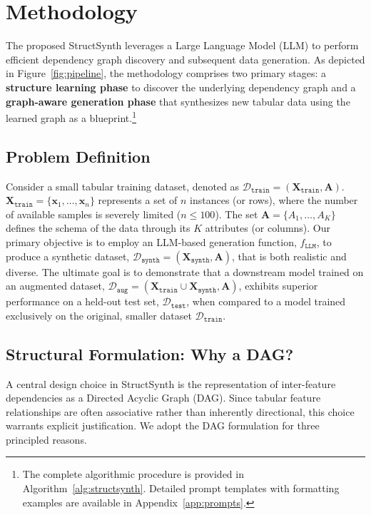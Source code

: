 \section{Methodology}

The proposed \textsf{StructSynth} leverages a Large Language Model (LLM) to perform efficient dependency graph discovery and subsequent data generation. As depicted in Figure~\ref{fig:pipeline}, the methodology comprises two primary stages: a \textbf{structure learning phase} to discover the underlying dependency graph and a \textbf{graph-aware generation phase} that synthesizes new tabular data using the learned graph as a blueprint.\footnote{The complete algorithmic procedure is provided in Algorithm~\ref{alg:structsynth}. Detailed prompt templates with formatting examples are available in Appendix~\ref{app:prompts}.}

\subsection{Problem Definition}

Consider a small tabular training dataset, denoted as $\mathcal{D}_{\mathtt{train}} = (\mathbf{X}_{\mathtt{train}}, \mathbf{A})$. $\mathbf{X}_{\mathtt{train}} = \{\mathbf{x}_1, \ldots, \mathbf{x}_n\}$ represents a set of $n$ instances (or rows), where the number of available samples is severely limited ($n \le 100$). The set $\mathbf{A} = \{A_1, \ldots, A_K\}$ defines the schema of the data through its $K$ attributes (or columns). Our primary objective is to employ an LLM-based generation function, $f_{\mathtt{LLM}}$, to produce a synthetic dataset, $\mathcal{D}_{\mathtt{synth}} = (\mathbf{X}_{\mathtt{synth}}, \mathbf{A})$, that is both realistic and diverse. The ultimate goal is to demonstrate that a downstream model trained on an augmented dataset, $\mathcal{D}_{\mathtt{aug}} = (\mathbf{X}_{\mathtt{train}} \cup \mathbf{X}_{\mathtt{synth}}, \mathbf{A})$, exhibits superior performance on a held-out test set, $\mathcal{D}_{\mathtt{test}}$, when compared to a model trained exclusively on the original, smaller dataset $\mathcal{D}_{\mathtt{train}}$.

\subsection{Structural Formulation: Why a DAG?}
\label{sec:why_dag}

A central design choice in \textsf{StructSynth} is the representation of inter-feature dependencies as a Directed Acyclic Graph (DAG). Since tabular feature relationships are often associative rather than inherently directional, this choice warrants explicit justification. We adopt the DAG formulation for three principled reasons.

